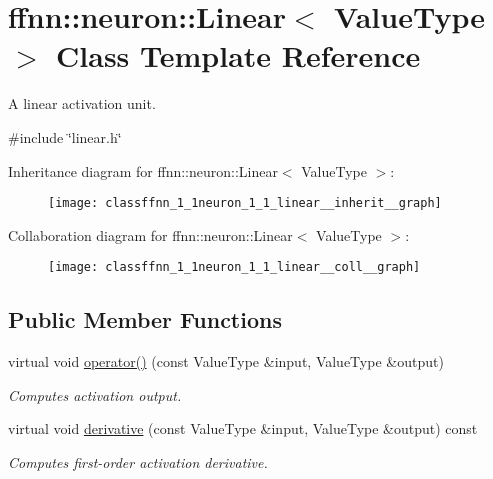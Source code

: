\hypertarget{classffnn_1_1neuron_1_1_linear}{\section{ffnn\-:\-:neuron\-:\-:Linear$<$ Value\-Type $>$ Class Template Reference}
\label{classffnn_1_1neuron_1_1_linear}
}


A linear activation unit.  




{\ttfamily \#include \char`\"{}linear.\-h\char`\"{}}



Inheritance diagram for ffnn\-:\-:neuron\-:\-:Linear$<$ Value\-Type $>$\-:\nopagebreak
\begin{figure}[H]
\begin{center}
\leavevmode
\texttt{[image: classffnn\_1\_1neuron\_1\_1\_linear\_\_inherit\_\_graph]}
\end{center}
\end{figure}


Collaboration diagram for ffnn\-:\-:neuron\-:\-:Linear$<$ Value\-Type $>$\-:\nopagebreak
\begin{figure}[H]
\begin{center}
\leavevmode
\texttt{[image: classffnn\_1\_1neuron\_1\_1\_linear\_\_coll\_\_graph]}
\end{center}
\end{figure}
\subsection*{Public Member Functions}
\begin{DoxyCompactItemize}
\item 
virtual void \hyperlink{classffnn_1_1neuron_1_1_linear_aa59814449ab3e63d2cbd4f01fd500044}{operator()} (const Value\-Type \&input, Value\-Type \&output)
\begin{DoxyCompactList}\small\item\em Computes activation output. \end{DoxyCompactList}\item 
virtual void \hyperlink{classffnn_1_1neuron_1_1_linear_a4656398d6a4c1bda77d25adbad148ae9}{derivative} (const Value\-Type \&input, Value\-Type \&output) const 
\begin{DoxyCompactList}\small\item\em Computes first-\/order activation derivative. \end{DoxyCompactList}\end{DoxyCompactItemize}


